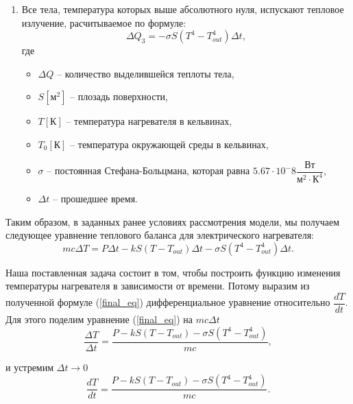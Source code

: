 \begin{enumerate}
		\item Все тела, температура которых выше абсолютного нуля, испускают тепловое излучение, расчитываемое по формуле:
			\begin{equation}
				\Delta Q_3 = - \sigma S \left( T^4 - T_{out}^4 \right) \Delta t,
			\end{equation}
			где \begin{itemize}
				\item  \( \Delta Q \) -- количество выделившейся теплоты тела,
				\item \( S  \left[\text{м}^2 \right] \) -- плозадь поверхности,
				\item \( T \left[\text{К} \right] \) -- температура нагревателя в кельвинах,
				\item \( T_0 \left[\text{К} \right] \) -- температура окружающей среды в кельвинах,
				\item \( \sigma \) -- постоянная Стефана-Больцмана, которая равна \(5.67 \cdot 10^-8 \dfrac{\text{Вт}}{\text{м}^2 \cdot \text{К}^4} \),
				\item \( \Delta t \) -- прошедшее время.
			\end{itemize}
	\end{enumerate}

	Таким образом, в заданных ранее условиях рассмотрения модели, мы получаем следующее уравнение теплового баланса для электрического нагревателя:
	\begin{equation}
		mc \Delta T = P \Delta t -kS \left( T - T_{out} \right) \Delta t - \sigma S \left( T^4 - T_{out}^4 \right) \Delta t.
		\label{final_eq}
	\end{equation}

	Наша поставленная задача состоит в том, чтобы построить функцию изменения температуры нагревателя в зависимости от времени. Потому выразим из полученной формуле (\ref{final_eq}) дифференциальное уравнение относительно \( \dfrac{dT}{dt} \).
	Для этого поделим уравнение (\ref{final_eq}) на \( mc \Delta t \)
	\begin{equation*}
		\dfrac{\Delta T}{\Delta t}  = \dfrac{P -kS \left( T - T_{out} \right) - \sigma S \left( T^4 - T_{out}^4 \right)}{mc},
	\end{equation*}

	и устремим \( \Delta t \rightarrow 0 \)
	\begin{equation*}
		\dfrac{d T}{d t}  = \dfrac{P -kS \left( T - T_{out} \right) - \sigma S \left( T^4 - T_{out}^4 \right)}{mc}.
	\end{equation*}

